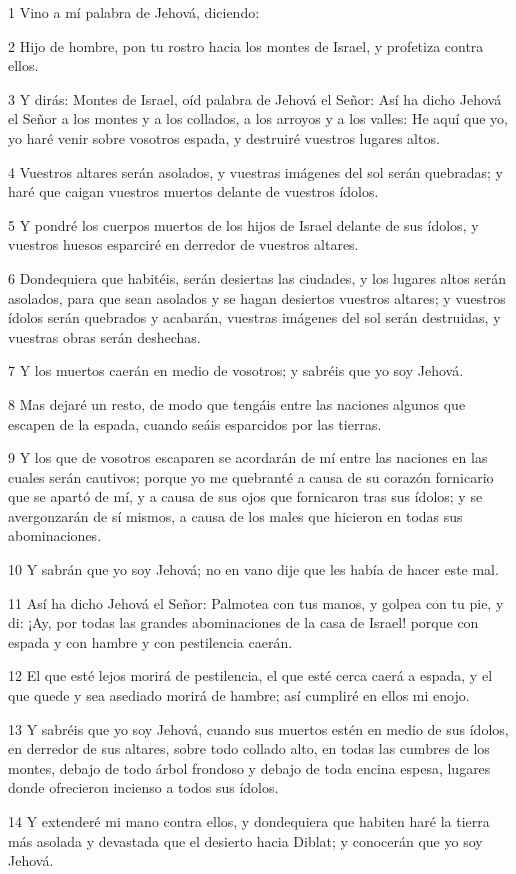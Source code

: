 \par 1 Vino a mí palabra de Jehová, diciendo:
\par 2 Hijo de hombre, pon tu rostro hacia los montes de Israel, y profetiza contra ellos.
\par 3 Y dirás: Montes de Israel, oíd palabra de Jehová el Señor: Así ha dicho Jehová el Señor a los montes y a los collados, a los arroyos y a los valles: He aquí que yo, yo haré venir sobre vosotros espada, y destruiré vuestros lugares altos.
\par 4 Vuestros altares serán asolados, y vuestras imágenes del sol serán quebradas; y haré que caigan vuestros muertos delante de vuestros ídolos.
\par 5 Y pondré los cuerpos muertos de los hijos de Israel delante de sus ídolos, y vuestros huesos esparciré en derredor de vuestros altares.
\par 6 Dondequiera que habitéis, serán desiertas las ciudades, y los lugares altos serán asolados, para que sean asolados y se hagan desiertos vuestros altares; y vuestros ídolos serán quebrados y acabarán, vuestras imágenes del sol serán destruidas, y vuestras obras serán deshechas.
\par 7 Y los muertos caerán en medio de vosotros; y sabréis que yo soy Jehová.
\par 8 Mas dejaré un resto, de modo que tengáis entre las naciones algunos que escapen de la espada, cuando seáis esparcidos por las tierras.
\par 9 Y los que de vosotros escaparen se acordarán de mí entre las naciones en las cuales serán cautivos; porque yo me quebranté a causa de su corazón fornicario que se apartó de mí, y a causa de sus ojos que fornicaron tras sus ídolos; y se avergonzarán de sí mismos, a causa de los males que hicieron en todas sus abominaciones.
\par 10 Y sabrán que yo soy Jehová; no en vano dije que les había de hacer este mal.
\par 11 Así ha dicho Jehová el Señor: Palmotea con tus manos, y golpea con tu pie, y di: ¡Ay, por todas las grandes abominaciones de la casa de Israel! porque con espada y con hambre y con pestilencia caerán.
\par 12 El que esté lejos morirá de pestilencia, el que esté cerca caerá a espada, y el que quede y sea asediado morirá de hambre; así cumpliré en ellos mi enojo.
\par 13 Y sabréis que yo soy Jehová, cuando sus muertos estén en medio de sus ídolos, en derredor de sus altares, sobre todo collado alto, en todas las cumbres de los montes, debajo de todo árbol frondoso y debajo de toda encina espesa, lugares donde ofrecieron incienso a todos sus ídolos.
\par 14 Y extenderé mi mano contra ellos, y dondequiera que habiten haré la tierra más asolada y devastada que el desierto hacia Diblat; y conocerán que yo soy Jehová.

